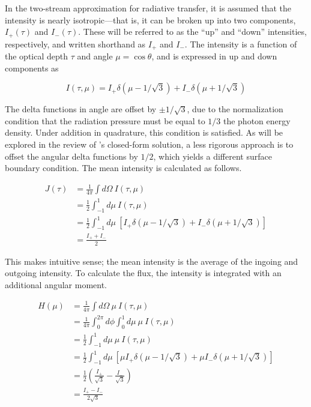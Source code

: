 \documentclass[onecolumn]{aastex63}
\begin{document}
In the two-stream approximation for radiative transfer, it is assumed that the intensity is nearly isotropic---that is, it can be broken up into two components, $I_+(\tau)$ and $I_-(\tau)$. These will be referred to as the ``up'' and ``down'' intensities, respectively, and written shorthand as $I_+$ and $I_-$. The intensity is a function of the optical depth $\tau$ and angle $\mu = \cos{\theta}$, and is expressed in up and down components as

\begin{equation}
    I(\tau, \mu) = I_+ \delta(\mu - 1/\sqrt{3}) + I_- \delta(\mu + 1/\sqrt{3})
\end{equation}

The delta functions in angle are offset by $\pm 1/\sqrt{3}$, due to the normalization condition that the radiation pressure must be equal to $1/3$ the photon energy density. Under addition in quadrature, this condition is satisfied. As will be explored in the review of \cite{2006ApJ...649...14D}'s closed-form solution, a less rigorous approach is to offset the angular delta functions by $1/2$, which yields a different surface boundary condition.  The mean intensity is calculated as follows.

\begin{equation}
    \begin{split}
    J(\tau) &= \frac{1}{4\pi}\int d\Omega\ I(\tau, \mu)\\ 
    &= \frac{1}{2}\int_{-1}^1 d\mu\ I(\tau, \mu)\\
    &= \frac{1}{2}\int_{-1}^1 d\mu\ \left[I_+ \delta(\mu - 1/\sqrt{3}) + I_- \delta(\mu + 1/\sqrt{3})\right]\\
    &= \frac{I_+ + I_-}{2}
    \end{split}
\end{equation}

This makes intuitive sense; the mean intensity is the average of the ingoing and outgoing intensity. To calculate the flux, the intensity is integrated with an additional angular moment.


\begin{equation}
    \begin{split}
        H(\mu) &= \frac{1}{4\pi}\int d\Omega\ \mu\ I(\tau, \mu)\\
        &= \frac{1}{4\pi}\int_0^{2\pi} d\phi \int_0^1 d\mu\ \mu\ I(\tau, \mu)\\
        &= \frac{1}{2} \int_{-1}^1 d\mu\ \mu\ I(\tau, \mu)\\
        &= \frac{1}{2} \int_{-1}^1 d\mu\ \left[\mu I_+ \delta(\mu - 1/\sqrt{3}) + \mu I_- \delta(\mu + 1/\sqrt{3})\right]\\
        &= \frac{1}{2} \left( \frac{I_+}{\sqrt{3}} - \frac{I_-}{\sqrt{3}}\right) \\
        &= \frac{I_+ - I_-}{2\sqrt{3}}
    \end{split}
\end{equation}
\end{document}
